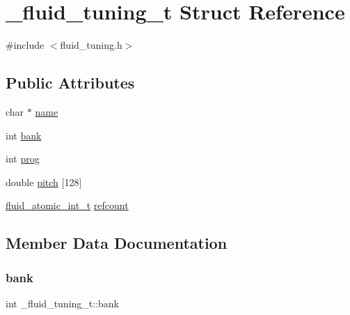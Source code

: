 \hypertarget{struct__fluid__tuning__t}{}\section{\+\_\+fluid\+\_\+tuning\+\_\+t Struct Reference}
\label{struct__fluid__tuning__t}


{\ttfamily \#include $<$fluid\+\_\+tuning.\+h$>$}

\subsection*{Public Attributes}
\begin{DoxyCompactItemize}
\item 
char $\ast$ \hyperlink{struct__fluid__tuning__t_a21467840d06372b094d307f9639480da}{name}
\item 
int \hyperlink{struct__fluid__tuning__t_a1f1f2897f6e87dc4dcd99a874a706657}{bank}
\item 
int \hyperlink{struct__fluid__tuning__t_a6770e4bf001805e39c0d84bb2a5b1f4b}{prog}
\item 
double \hyperlink{struct__fluid__tuning__t_aa6a64e8c5fe6cbed8f73a1957719b275}{pitch} \mbox{[}128\mbox{]}
\item 
\hyperlink{fluidsynth__priv_8h_a6b8be882dd9958ea3635a868e1bf5152}{fluid\+\_\+atomic\+\_\+int\+\_\+t} \hyperlink{struct__fluid__tuning__t_a234f93b6e2b0d24327fecf44c997bdbb}{refcount}
\end{DoxyCompactItemize}


\subsection{Member Data Documentation}
\mbox{\label{struct__fluid__tuning__t_a1f1f2897f6e87dc4dcd99a874a706657}} 
\subsubsection{\texorpdfstring{bank}{bank}}
{\footnotesize\ttfamily int \+\_\+fluid\+\_\+tuning\+\_\+t\+::bank}

\mbox{\label{struct__fluid__tuning__t_a21467840d06372b094d307f9639480da}} 
